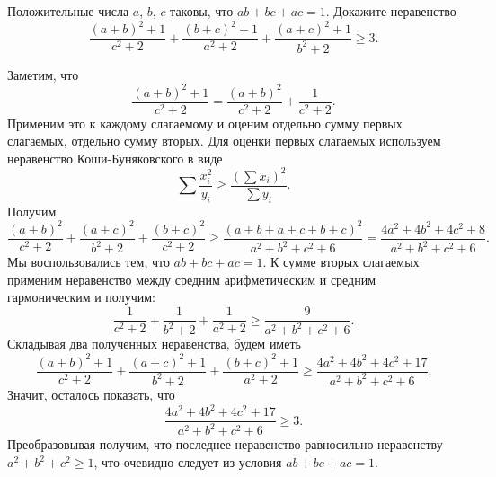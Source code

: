 \problem
Положительные числа $a$, $b$, $c$ таковы, что $a b + b c + a c = 1$.
Докажите неравенство
\[
    \frac{(a + b)^2 + 1}{c^2 + 2}
    +
    \frac{(b + c)^2 + 1}{a^2 + 2}
    +
    \frac{(a + c)^2 + 1}{b^2 + 2}
\geq
    3
.\]

\solution
Заметим, что
\[
    \frac{(a + b)^2 + 1}{c^2 + 2}
=
    \frac{(a + b)^2}{c^2 + 2} + \frac{1}{c^2 + 2}
.\]
Применим это к каждому слагаемому и оценим отдельно сумму первых слагаемых,
отдельно сумму вторых.
Для оценки первых слагаемых используем неравенство Коши-Буняковского в виде
\[
    \sum\frac{x_i^2}{y_i}
\geq
    \frac{(\sum x_i)^2}{\sum y_i}
.\]
Получим
\[
    \frac{(a + b)^2}{c^2 + 2}
    +
    \frac{(a + c)^2}{b^2 + 2}
    +
    \frac{(b + c)^2}{c^2+2}
\geq
    \frac{(a + b + a + c + b + c)^2}{a^2 + b^2 + c^2 + 6}
=
    \frac{4 a^2 + 4 b^2 + 4 c^2 + 8}{a^2 + b^2 + c^2 + 6}
.\]
Мы воспользовались тем, что $a b + b c + a c = 1$.
К сумме вторых слагаемых применим неравенство между средним арифметическим и
средним гармоническим и получим:
\[
    \frac{1}{c^2 + 2}
    +
    \frac{1}{b^2 + 2}
    +
    \frac{1}{a^2 + 2}
\geq
    \frac{9}{a^2 + b^2 + c^2 + 6}
.\]
Складывая два полученных неравенства, будем иметь
\[
    \frac{(a + b)^2 + 1}{c^2 + 2}
    +
    \frac{(a + c)^2 + 1}{b^2 + 2}
    +
    \frac{(b + c)^2 + 1}{a^2 + 2}
\geq
    \frac{4 a^2 + 4 b^2 + 4 c^2 + 17}{a^2 + b^2 + c^2 + 6}.
\]
Значит, осталось показать, что
\[
    \frac{4 a^2 + 4 b^2 + 4 c^2 + 17}{a^2 + b^2 + c^2 + 6}
\geq
    3
.\]
Преобразовывая получим, что последнее неравенство равносильно неравенству
$a^2 + b^2 + c^2 \geq 1$, что очевидно следует из условия
$a b + b c + a c = 1$.

\endproblem
